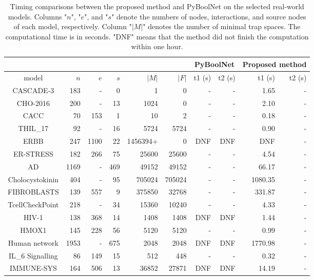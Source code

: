\documentclass[runningheads]{llncs}
\begin{document}
\begin{table}[!ht]
\centering
\caption{Timing comparisons between the proposed method and PyBoolNet on the selected real-world models. Columns "\(n\)", "\(e\)", and "\(s\)" denote the numbers of nodes, interactions, and source nodes of each model, respectively. Column "\(|M|\)" denotes the number of minimal trap spaces. The computational time is in seconds. "DNF" means that the method did not finish the computation within one hour.}
\label{tab:result_real}
\begin{tabular}{|c|r|r|r|r|r|r|r|r|r|}
\cline{7-10}
\multicolumn{1}{l}{} & \multicolumn{1}{l}{} & \multicolumn{1}{l}{} & \multicolumn{1}{l}{} & \multicolumn{1}{l}{} & \multicolumn{1}{l|}{} & \multicolumn{2}{c|}{PyBoolNet} & \multicolumn{2}{c|}{Proposed method} \\ \hline
model & $n$ & $e$ & $s$ & $|M|$ & $|F|$ & t1 (s) & t2 (s) & t1 (s) & t2 (s) \\ \hline
CASCADE-3 & 183 & - & 0 & 1 & 0 & - & - & 1.65 & - \\ \hline
CHO-2016 & 200 & - & 13 & 1024 & 0 & - & - & 2.10 & - \\ \hline
CACC & 70 & 153 & 1 & 10 & 2 & - & - & 0.18 & - \\ \hline
THIL\_17 & 92 & - & 16 & 5724 & 5724 & - & - & 0.90 & - \\ \hline
ERBB & 247 & 1100 & 22 & 1456394+ & 0 & DNF & DNF & DNF & - \\ \hline
ER-STRESS & 182 & 266 & 75 & 25600 & 25600 & - & - & 4.54 & - \\ \hline
AD & 1169 & - & 469 & 49152 & 49152 & - & - & 66.17 & - \\ \hline
Cholocystokinin & 404 & - & 95 & 705024 & 705024 & - & - & 1080.35 & - \\ \hline
FIBROBLASTS & 139 & 557 & 9 & 375850 & 32768 & - & - & 331.87 & - \\ \hline
TcellCheckPoint & 218 & - & 34 & 15360 & 10240 & - & - & 4.33 & - \\ \hline
HIV-1 & 138 & 368 & 14 & 1408 & 1408 & DNF & DNF & 1.44 & - \\ \hline
HMOX1 & 145 & 228 & 56 & 5120 & 5120 & - & - & 0.99 & - \\ \hline
Human network & 1953 & - & 675 & 2048 & 2048 & DNF & DNF & 1770.98 & - \\ \hline
IL\_6 Signalling & 86 & 149 & 15 & 512 & 448 & - & - & 0.32 & - \\ \hline
IMMUNE-SYS & 164 & 506 & 13 & 36852 & 27871 & DNF & DNF & 14.19 & - \\ \hline

\end{tabular}
\end{table}
\end{document}
